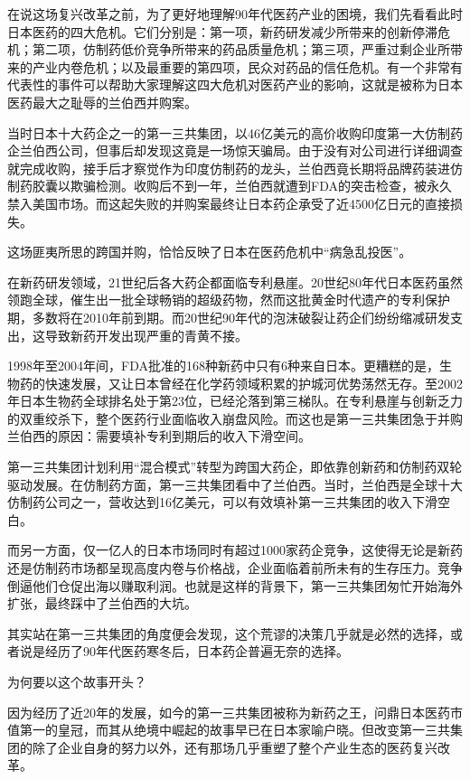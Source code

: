 在说这场复兴改革之前，为了更好地理解90年代医药产业的困境，我们先看看此时日本医药的四大危机。它们分别是：第一项，新药研发减少所带来的创新停滞危机；第二项，仿制药低价竞争所带来的药品质量危机；第三项，严重过剩企业所带来的产业内卷危机；以及最重要的第四项，民众对药品的信任危机。有一个非常有代表性的事件可以帮助大家理解这四大危机对医药产业的影响，这就是被称为日本医药最大之耻辱的兰伯西并购案。

当时日本十大药企之一的第一三共集团，以46亿美元的高价收购印度第一大仿制药企兰伯西公司，但事后却发现这竟是一场惊天骗局。由于没有对公司进行详细调查就完成收购，接手后才察觉作为印度仿制药的龙头，兰伯西竟长期将品牌药装进仿制药胶囊以欺骗检测。收购后不到一年，兰伯西就遭到FDA的突击检查，被永久禁入美国市场。而这起失败的并购案最终让日本药企承受了近4500亿日元的直接损失。

这场匪夷所思的跨国并购，恰恰反映了日本在医药危机中“病急乱投医”。

在新药研发领域，21世纪后各大药企都面临专利悬崖。20世纪80年代日本医药虽然领跑全球，催生出一批全球畅销的超级药物，然而这批黄金时代遗产的专利保护期，多数将在2010年前到期。而20世纪90年代的泡沫破裂让药企们纷纷缩减研发支出，这导致新药开发出现严重的青黄不接。

1998年至2004年间，FDA批准的168种新药中只有6种来自日本。更糟糕的是，生物药的快速发展，又让日本曾经在化学药领域积累的护城河优势荡然无存。至2002年日本生物药全球排名处于第23位，已经沦落到第三梯队。在专利悬崖与创新乏力的双重绞杀下，整个医药行业面临收入崩盘风险。而这也是第一三共集团急于并购兰伯西的原因：需要填补专利到期后的收入下滑空间。

第一三共集团计划利用“混合模式”转型为跨国大药企，即依靠创新药和仿制药双轮驱动发展。在仿制药方面，第一三共集团看中了兰伯西。当时，兰伯西是全球十大仿制药公司之一，营收达到16亿美元，可以有效填补第一三共集团的收入下滑空白。

而另一方面，仅一亿人的日本市场同时有超过1000家药企竞争，这使得无论是新药还是仿制药市场都呈现高度内卷与价格战，企业面临着前所未有的生存压力。竞争倒逼他们仓促出海以赚取利润。也就是这样的背景下，第一三共集团匆忙开始海外扩张，最终踩中了兰伯西的大坑。

其实站在第一三共集团的角度便会发现，这个荒谬的决策几乎就是必然的选择，或者说是经历了90年代医药寒冬后，日本药企普遍无奈的选择。

为何要以这个故事开头？

因为经历了近20年的发展，如今的第一三共集团被称为新药之王，问鼎日本医药市值第一的皇冠，而其从绝境中崛起的故事早已在日本家喻户晓。但改变第一三共集团的除了企业自身的努力以外，还有那场几乎重塑了整个产业生态的医药复兴改革。

